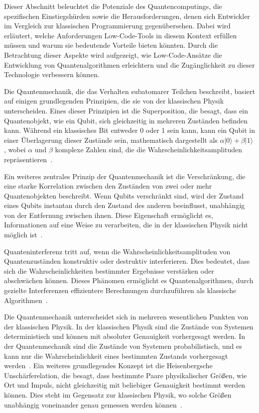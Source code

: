 Dieser Abschnitt beleuchtet die Potenziale des Quantencomputings, die spezifischen Einstiegshürden sowie die 
Herausforderungen, denen sich Entwickler im Vergleich zur klassischen Programmierung gegenübersehen. Dabei wird 
erläutert, welche Anforderungen Low-Code-Tools in diesem Kontext erfüllen müssen und warum sie bedeutende Vorteile 
bieten könnten. Durch die Betrachtung dieser Aspekte wird aufgezeigt, wie Low-Code-Ansätze die Entwicklung von 
Quantenalgorithmen erleichtern und die Zugänglichkeit zu dieser Technologie verbessern können.

Die Quantenmechanik, die das Verhalten subatomarer Teilchen beschreibt, basiert auf einigen grundlegenden Prinzipien, 
die sie von der klassischen Physik unterscheiden. Eines dieser Prinzipien ist die Superposition, die besagt, dass ein 
Quantenobjekt, wie ein Qubit, sich gleichzeitig in mehreren Zuständen befinden kann. Während ein klassisches Bit 
entweder 0 oder 1 sein kann, kann ein Qubit in einer Überlagerung dieser Zustände sein, mathematisch dargestellt 
als \( \alpha|0\rangle + \beta|1\rangle \), wobei \( \alpha \) und \( \beta \) komplexe Zahlen sind, die die 
Wahrscheinlichkeitsamplituden repräsentieren~\cite{nielsen2010quantum}.

Ein weiteres zentrales Prinzip der Quantenmechanik ist die Verschränkung, die eine starke Korrelation zwischen den 
Zuständen von zwei oder mehr Quantenobjekten beschreibt. Wenn Qubits verschränkt sind, wird der Zustand eines Qubits 
instantan durch den Zustand des anderen beeinflusst, unabhängig von der Entfernung zwischen ihnen. Diese Eigenschaft 
ermöglicht es, Informationen auf eine Weise zu verarbeiten, die in der klassischen Physik nicht möglich ist~\cite{einstein1935can}.

Quanteninterferenz tritt auf, wenn die Wahrscheinlichkeitsamplituden von Quantenzuständen konstruktiv oder 
destruktiv interferieren. Dies bedeutet, dass sich die Wahrscheinlichkeiten bestimmter Ergebnisse verstärken oder 
abschwächen können. Dieses Phänomen ermöglicht es Quantenalgorithmen, durch gezielte Interferenzen effizientere 
Berechnungen durchzuführen als klassische Algorithmen~\cite{feynman2018simulating}.

Die Quantenmechanik unterscheidet sich in mehreren wesentlichen Punkten von der klassischen Physik. In der 
klassischen Physik sind die Zustände von Systemen deterministisch und können mit absoluter Genauigkeit 
vorhergesagt werden. In der Quantenmechanik sind die Zustände von Systemen probabilistisch, und es kann 
nur die Wahrscheinlichkeit eines bestimmten Zustands vorhergesagt werden~\cite{griffiths2018introduction}. 
Ein weiteres grundlegendes Konzept ist die Heisenbergsche Unschärferelation, die besagt, dass bestimmte Paare 
physikalischer Größen, wie Ort und Impuls, nicht gleichzeitig mit beliebiger Genauigkeit bestimmt werden können. 
Dies steht im Gegensatz zur klassischen Physik, wo solche Größen unabhängig voneinander genau gemessen werden 
können~\cite{heisenberg1927anschaulichen}.

